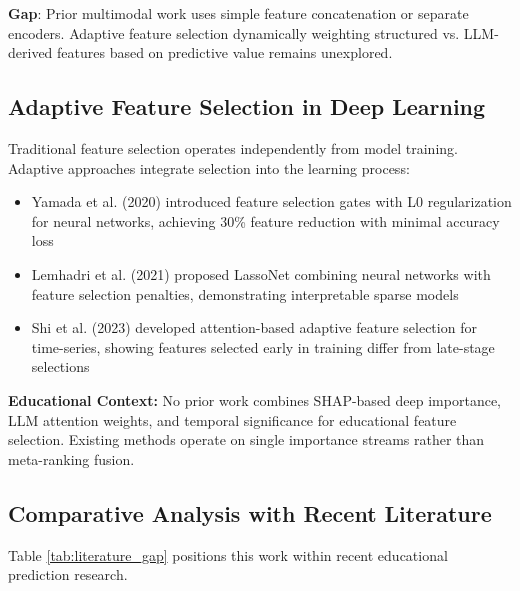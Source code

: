 \textbf{Gap}: Prior multimodal work uses simple feature concatenation or separate encoders. Adaptive feature selection dynamically weighting structured vs. LLM-derived features based on predictive value remains unexplored.

\subsection{Adaptive Feature Selection in Deep Learning}

Traditional feature selection operates independently from model training. Adaptive approaches integrate selection into the learning process:

\begin{itemize}
\item Yamada et al. (2020) introduced feature selection gates with L0 regularization for neural networks, achieving 30\% feature reduction with minimal accuracy loss
\item Lemhadri et al. (2021) proposed LassoNet combining neural networks with feature selection penalties, demonstrating interpretable sparse models
\item Shi et al. (2023) developed attention-based adaptive feature selection for time-series, showing features selected early in training differ from late-stage selections
\end{itemize}

\textbf{Educational Context:} No prior work combines SHAP-based deep importance, LLM attention weights, and temporal significance for educational feature selection. Existing methods operate on single importance streams rather than meta-ranking fusion.

\subsection{Comparative Analysis with Recent Literature}

Table \ref{tab:literature_gap} positions this work within recent educational prediction research.

